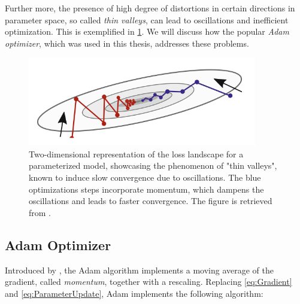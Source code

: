 Further more, the presence of high degree of distortions in certain directions in parameter space, so called  \emph{thin valleys}, can lead to oscillations and inefficient optimization. This is exemplified in \cref{fig:thinValley}. We will discuss how the popular \emph{Adam optimizer}, which was used in this thesis, addresses these problems.

\begin{figure}[htp]
    \centering
    \includegraphics[width=10cm]{latex/figures/thin_vally.png}
    \caption{Two-dimensional representation of the loss landscape for a parameterized model, showcasing the phenomenon of "thin valleys", known to induce slow convergence due to oscillations. The blue optimizations steps incorporate momentum, which dampens the oscillations and leads to faster convergence. The figure is retrieved from \citet{SupervisedwquantumComputers}.}
    \label{fig:thinValley}
\end{figure}



\subsection{Adam Optimizer}\label{sec:AdamOptimizer}
Introduced by \citet{kingma2017adam}, the Adam algorithm implements a moving average of the gradient, called \emph{momentum}, together with a rescaling. Replacing \cref{eq:Gradient} and \cref{eq:ParameterUpdate}, Adam implements the following algorithm:

